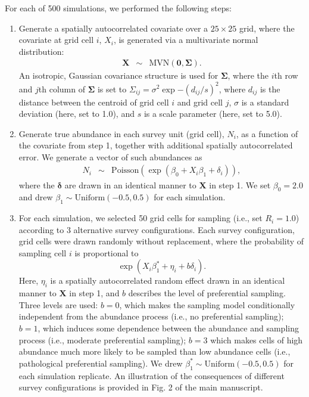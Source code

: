 \documentclass[times,mee,doublespace,]{besauth2}
\begin{document}
\begin{flushleft}
For each of 500 simulations, we performed the following steps:

\begin{enumerate}
  \item Generate a spatially autocorrelated covariate over a $25 \times 25$ grid, where the covariate at grid cell $i$, $X_i$, is generated via a multivariate normal distribution:
      \begin{eqnarray}
        \textbf{X} & \sim & \textrm{MVN} (\textbf{0},\boldsymbol{\Sigma}).
        \label{eq:cov}
      \end{eqnarray}
      An isotropic, Gaussian covariance structure is used for $\boldsymbol{\Sigma}$, where the $i$th row and $j$th column of $\boldsymbol{\Sigma}$ is set to $\Sigma_{ij}=\sigma^2 \exp{-(d_{ij}/s)^2}$, where $d_{ij}$ is the distance between the centroid of grid cell $i$ and grid cell $j$, $\sigma$ is a standard deviation (here, set to 1.0), and $s$ is a scale parameter (here, set to 5.0).
  \item Generate true abundance in each survey unit (grid cell), $N_i$, as a function of the covariate from step 1, together with additional spatially autocorrelated error.  We generate a vector of such abundances as
      \begin{eqnarray}
        N_i & \sim & \textrm{Poisson}(\exp(\beta_0 + X_i \beta_1 + \delta_i)),
      \end{eqnarray}
      where the $\boldsymbol{\delta}$ are drawn in an identical manner to $\textbf{X}$ in step 1.  We set $\beta_0 = 2.0$ and drew $\beta_1 \sim \textrm{Uniform}(-0.5,0.5)$ for each simulation.
  \item For each simulation, we selected 50 grid cells for sampling (i.e., set $R_i = 1.0$) according to 3 alternative survey configurations.  Each survey configuration, grid cells were drawn randomly without replacement, where the probability of sampling cell $i$ is proportional to
      \begin{equation*}
        \exp(X_i \beta_1^*  + \eta_i + b \delta_i).
      \end{equation*}
      Here, $\eta_i$ is a spatially autocorrelated random effect drawn in an identical manner to $\textbf{X}$ in step 1, and $b$ describes the level of preferential sampling.  Three levels are used: $b=0$, which makes the sampling model conditionally independent from the abundance process (i.e., no preferential sampling); $b=1$, which induces some dependence between the abundance and sampling process (i.e., moderate preferential sampling); $b=3$ which makes cells of high abundance much more likely to be sampled than low abundance cells (i.e., pathological preferential sampling).   We drew $\beta_1^* \sim \textrm{Uniform}(-0.5,0.5)$ for each simulation replicate.  An illustration of the consequences of different survey configurations is provided in Fig. 2 of the main manuscript.

\end{enumerate}
\end{flushleft}
\end{document}

